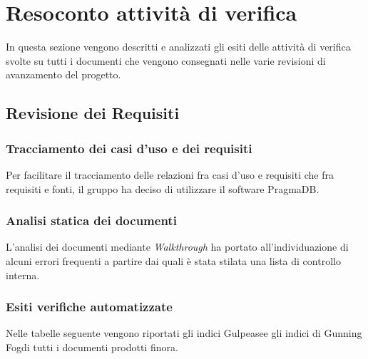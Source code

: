 \section{Resoconto attività di verifica}
In questa sezione vengono descritti e analizzati gli esiti delle attività
di verifica svolte su tutti i documenti che vengono consegnati nelle varie 
revisioni di avanzamento del progetto.

\subsection{Revisione dei Requisiti}
\subsubsection{Tracciamento dei casi d'uso e dei requisiti}
Per facilitare il tracciamento delle relazioni fra casi d'uso e requisiti che
fra requisiti e fonti, il gruppo ha deciso di utilizzare il software PragmaDB.

\subsubsection{Analisi statica dei documenti}
L'analisi dei documenti mediante \textit{Walkthrough}\glo{} ha portato 
all'individuazione di alcuni errori frequenti a partire dai quali è stata 
stilata una lista di controllo interna.

\subsubsection{Esiti verifiche automatizzate}
Nelle tabelle seguente vengono riportati gli indici Gulpease\glosp e gli indici di Gunning Fog\glosp di tutti
i documenti prodotti finora.

	
